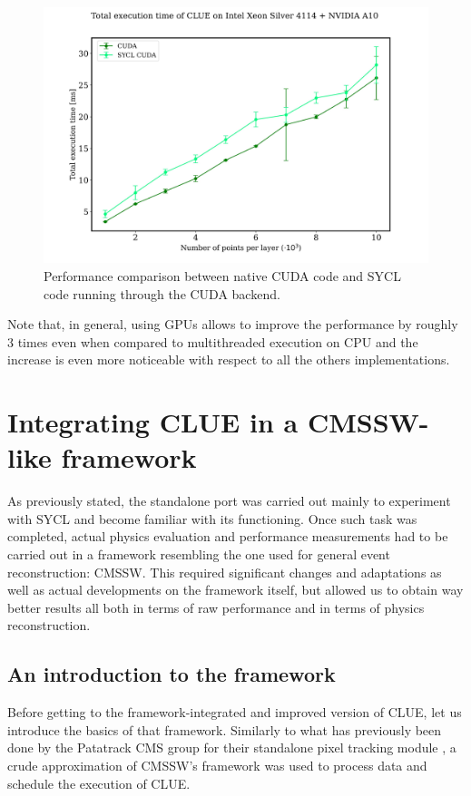 \begin{figure}[H]
    \centering
    \includegraphics[width=\textwidth]{media/clue_standalone_cuda.jpg}
    \caption{Performance comparison between native CUDA code and SYCL code running through the CUDA backend.}
    \label{fig:clue_standalone_cuda}
\end{figure}

Note that, in general, using GPUs allows to improve the performance by roughly 3 times even when compared to multithreaded execution on CPU and the increase is even more noticeable with respect to all the others implementations.

\section{Integrating CLUE in a CMSSW-like framework}
As previously stated, the standalone port was carried out mainly to experiment with SYCL and become familiar with its functioning. Once such task was completed, actual physics evaluation and performance measurements had to be carried out in a framework resembling the one used for general event reconstruction: CMSSW. This required significant changes and adaptations as well as actual developments on the framework itself, but allowed us to obtain way better results all both in terms of raw performance and in terms of physics reconstruction.

\subsection{An introduction to the framework}
Before getting to the framework-integrated and improved version of CLUE, let us introduce the basics of that framework. Similarly to what has previously been done by the Patatrack CMS group for their standalone pixel tracking module \cite{pixeltrack}, a crude approximation of CMSSW's framework \cite{cmssw} was used to process data and schedule the execution of CLUE. 

